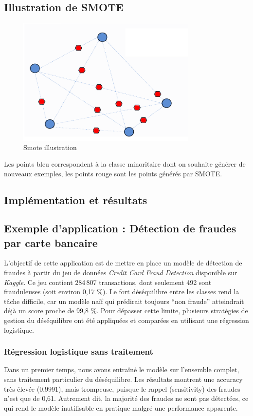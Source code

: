 \documentclass{article}
\begin{document}
\subsection{Illustration de SMOTE}

\begin{figure}[h!]
    \centering
    \includegraphics[width=0.8\textwidth]{images/smote.png}
    \caption{Smote illustration}
    \label{fig:example}
\end{figure}
Les points bleu correspondent à la classe minoritaire dont on souhaite générer de nouveaux exemples, les points rouge sont les points générés par SMOTE.

\newpage

\subsection{Implémentation et résultats}
\subsection*{Exemple d'application : Détection de fraudes par carte bancaire}

L’objectif de cette application est de mettre en place un modèle de détection de fraudes à partir du jeu de données \textit{Credit Card Fraud Detection} disponible sur \textit{Kaggle}.
Ce jeu contient 284\,807 transactions, dont seulement 492 sont frauduleuses (soit environ 0,17 \%).
Le fort déséquilibre entre les classes rend la tâche difficile, car un modèle naïf qui prédirait toujours ``non fraude'' atteindrait déjà un score proche de 99,8 \%.
Pour dépasser cette limite, plusieurs stratégies de gestion du déséquilibre ont été appliquées et comparées en utilisant une régression logistique.

\subsubsection*{Régression logistique sans traitement}
Dans un premier temps, nous avons entraîné le modèle sur l’ensemble complet, sans traitement particulier du déséquilibre.
Les résultats montrent une accuracy très élevée (0,9991), mais trompeuse, puisque le rappel (sensitivity) des fraudes n’est que de 0,61.
Autrement dit, la majorité des fraudes ne sont pas détectées, ce qui rend le modèle inutilisable en pratique malgré une performance apparente.
\end{document}
